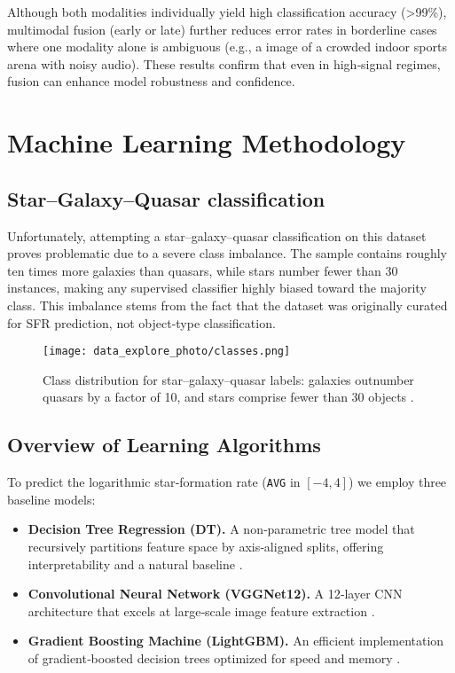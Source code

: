 \documentclass[english,bachelor,oneside]{ctufit-thesis}
\begin{document}
Although both modalities individually yield high classification accuracy (>99\%), multimodal fusion (early or late) further reduces error rates in borderline cases where one modality alone is ambiguous (e.g., a image of a crowded indoor sports arena with noisy audio). These results confirm that even in high‑signal regimes, fusion can enhance model robustness and confidence.

% 

\chapter{Machine Learning Methodology}
\label{ch:ml_methods}

\section{Star–Galaxy–Quasar classification}

Unfortunately, attempting a star–galaxy–quasar classification on this dataset proves problematic due to a severe class imbalance. The sample contains roughly ten times more galaxies than quasars, while stars number fewer than 30 instances, making any supervised classifier highly biased toward the majority class. This imbalance stems from the fact that the dataset was originally curated for SFR prediction, not object‐type classification.
\begin{figure}[H]
  \centering
  \texttt{[image: data\_explore\_photo/classes.png]}
  \caption{Class distribution for star–galaxy–quasar labels: galaxies outnumber quasars by a factor of 10, and stars comprise fewer than 30 objects \cite{data_exploring}.}
  \label{fig:class_distribution}
\end{figure}

\section{Overview of Learning Algorithms}
To predict the logarithmic star‐formation rate (\texttt{AVG} in $[-4,4]$) we employ three baseline models:
\begin{itemize}
  \item \textbf{Decision Tree Regression (DT).} A non‐parametric tree model that recursively partitions feature space by axis‐aligned splits, offering interpretability and a natural baseline \cite{Hastie2009}.
  \item \textbf{Convolutional Neural Network (VGGNet12).} A 12‐layer CNN architecture that excels at large‐scale image feature extraction \cite{SimonyanZisserman2014}.
  \item \textbf{Gradient Boosting Machine (LightGBM).} An efficient implementation of gradient‐boosted decision trees optimized for speed and memory \cite{Ke2017}.
\end{itemize}
\end{document}
